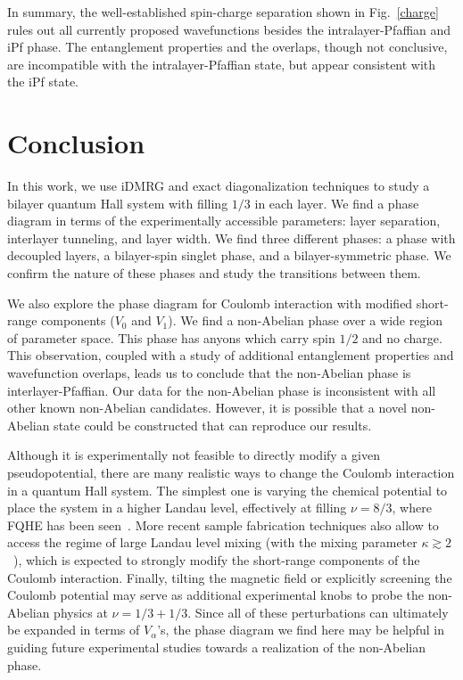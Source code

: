 In summary, the well-established spin-charge separation shown in Fig.~\ref{charge} rules out all currently proposed wavefunctions besides the intralayer-Pfaffian and iPf phase.
The entanglement properties and the overlaps, though not conclusive, are incompatible with the intralayer-Pfaffian state, but appear consistent with the iPf state.





\section{Conclusion}\label{sec:conclusions}

In this work, we use iDMRG and exact diagonalization techniques to study a bilayer quantum Hall system with filling $1/3$ in each layer. We find a phase diagram in terms of the experimentally accessible parameters: layer separation, interlayer tunneling, and layer width. We find three different phases: a phase with decoupled layers, a bilayer-spin singlet phase, and a bilayer-symmetric phase. We confirm the nature of these phases and study the transitions between them.

We also explore the phase diagram for Coulomb interaction with modified short-range components ($V_0$ and $V_1$). We find a non-Abelian phase over a wide region of parameter space.
This phase has anyons which carry spin $1/2$ and no charge.
This observation, coupled with a study of additional entanglement properties and wavefunction overlaps, leads us to conclude that the non-Abelian phase is interlayer-Pfaffian.
Our data for the non-Abelian phase is inconsistent with all other known non-Abelian candidates.
However, it is possible that a novel non-Abelian state could be constructed that can reproduce our results.

Although it is experimentally not feasible to directly modify a given pseudopotential, there are many realistic ways to change the Coulomb interaction in a quantum Hall system. The simplest one is varying the chemical potential to place the system in a higher Landau level, effectively at filling $\nu=8/3$, where FQHE has been seen~\cite{PanPhysRevB.77.075307, ChoiPhysRevB.77.081301,DolevPhysRevLett.107.036805}. More recent sample fabrication techniques also allow to access the regime of large Landau level mixing (with the mixing parameter $\kappa\gtrsim 2$~\cite{KumarPhysRevB.83.201305, SamkharadzePhysRevB.84.121305}), which is expected to strongly modify the short-range components of the Coulomb interaction. Finally, tilting the magnetic field or explicitly screening the Coulomb potential may serve as additional experimental knobs to probe the non-Abelian physics at $\nu=1/3+1/3$. Since all of these perturbations can ultimately be expanded in terms of $V_\alpha$'s, the phase diagram we find here may be helpful in guiding future experimental studies towards a realization of the non-Abelian phase. 




%


